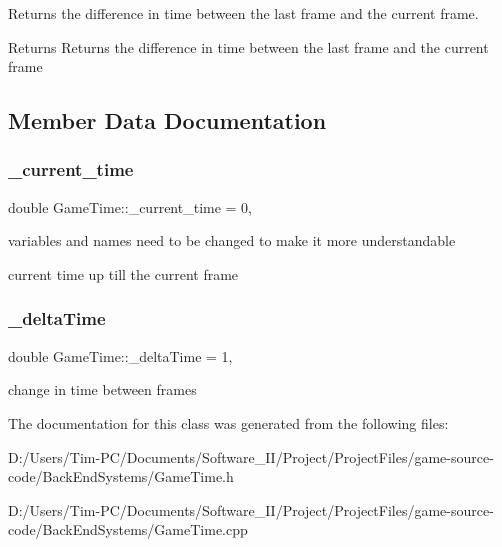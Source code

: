 Returns the difference in time between the last frame and the current frame. 

\begin{DoxyReturn}{Returns}
Returns the difference in time between the last frame and the current frame 
\end{DoxyReturn}


\subsection{Member Data Documentation}
\mbox{\label{class_game_time_a080d9deb72c675f0d68f9ad72eec66c3}} 
\subsubsection{\texorpdfstring{\+\_\+current\+\_\+time}{\_current\_time}}
{\footnotesize\ttfamily double Game\+Time\+::\+\_\+current\+\_\+time = 0\hspace{0.3cm}{\ttfamily [static]}, {\ttfamily [private]}}



variables and names need to be changed to make it more understandable 

current time up till the current frame \mbox{\label{class_game_time_a39c7a52db277a99fd6dfcb457b432d7d}} 
\subsubsection{\texorpdfstring{\+\_\+delta\+Time}{\_deltaTime}}
{\footnotesize\ttfamily double Game\+Time\+::\+\_\+delta\+Time = 1\hspace{0.3cm}{\ttfamily [static]}, {\ttfamily [private]}}

change in time between frames 

The documentation for this class was generated from the following files\+:\begin{DoxyCompactItemize}
\item 
D\+:/\+Users/\+Tim-\/\+P\+C/\+Documents/\+Software\+\_\+\+I\+I/\+Project/\+Project\+Files/game-\/source-\/code/\+Back\+End\+Systems/Game\+Time.\+h\item 
D\+:/\+Users/\+Tim-\/\+P\+C/\+Documents/\+Software\+\_\+\+I\+I/\+Project/\+Project\+Files/game-\/source-\/code/\+Back\+End\+Systems/Game\+Time.\+cpp\end{DoxyCompactItemize}
